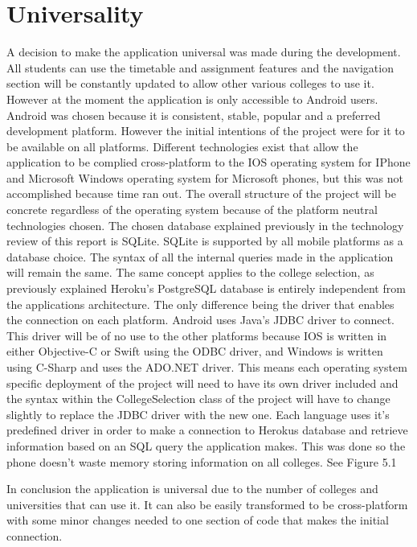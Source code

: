 \section{Universality}
A decision to make the application universal was made during the development. All students can use the timetable and assignment features and the navigation section will be constantly updated to allow other various colleges to use it. However at the moment the application is only accessible to Android users. Android was chosen because it is consistent, stable, popular and a preferred development platform. However the initial intentions of the project were for it to be available on all platforms. Different technologies exist that allow the application to be complied cross-platform to the IOS operating system for IPhone and Microsoft Windows operating system for Microsoft phones, but this was not accomplished because time ran out. The overall structure of the project will be concrete regardless of the operating system because of the platform neutral technologies chosen. The chosen database explained previously in the technology review of this report is SQLite. SQLite is supported by all mobile platforms as a database choice. The syntax of all the internal queries made in the application will remain the same. The same concept applies to the college selection, as previously explained Heroku's PostgreSQL database is entirely independent from the applications architecture. The only difference being the driver that enables the connection on each platform. Android uses Java's JDBC driver to connect. This driver will be of no use to the other platforms because IOS is written in either Objective-C or Swift using the ODBC driver, and Windows is written using C-Sharp and uses the ADO.NET driver. This means each operating system specific deployment of the project will need to have its own driver included and the syntax within the CollegeSelection class of the project will have to change slightly to replace the JDBC driver with the new one. Each language uses it's predefined driver in order to make a connection to Herokus database and retrieve information based on an SQL query the application makes. This was done so the phone doesn't waste memory storing information on all colleges. See Figure 5.1

In conclusion the application is universal due to the number of colleges and universities that can use it. It can also be easily transformed to be cross-platform with some minor changes needed to one section of code that makes the initial connection.

